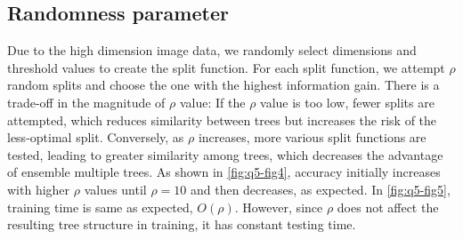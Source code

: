 \subsection{Randomness parameter}
Due to the high dimension image data, we randomly select dimensions and threshold values to create the split function. For each split function, we attempt $\rho$ random splits and choose the one with the highest information gain. There is a trade-off in the magnitude of $\rho$ value: If the $\rho$ value is too low, fewer splits are attempted, which reduces similarity between trees but increases the risk of the less-optimal split. Conversely, as $\rho$ increases, more various split functions are tested, leading to greater similarity among trees, which decreases the advantage of ensemble multiple trees. As shown in \cref{fig:q5-fig4}, accuracy initially increases with higher $\rho$ values until $\rho=10$ and then decreases, as expected. In \cref{fig:q5-fig5}, training time is same as expected, $O(\rho)$. However, since $\rho$ does not affect the resulting tree structure in training, it has constant testing time.

